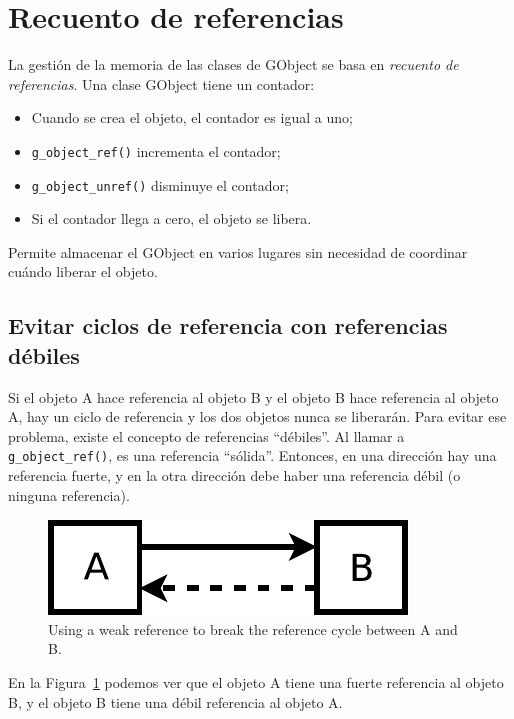 \section{Recuento de referencias}

La gestión de la memoria de las clases de GObject se basa en \emph{recuento de referencias}. Una clase GObject tiene un contador:
\begin{itemize}
    \item Cuando se crea el objeto, el contador es igual a uno;
    \item \lstinline{g_object_ref()} incrementa el contador;
    \item \lstinline{g_object_unref()} disminuye el contador;
    \item Si el contador llega a cero, el objeto se libera.
\end{itemize}

Permite almacenar el GObject en varios lugares sin necesidad de coordinar cuándo liberar el objeto.

\subsection{Evitar ciclos de referencia con referencias débiles}

Si el objeto A hace referencia al objeto B y el objeto B hace referencia al objeto A, hay un ciclo de referencia y los dos objetos nunca se liberarán. Para evitar ese problema, existe el concepto de referencias ``débiles''. Al llamar a \lstinline{g_object_ref()}, es una referencia ``sólida''. Entonces, en una dirección hay una referencia fuerte, y en la otra dirección debe haber una referencia débil (o ninguna referencia).

\begin{figure}
  \begin{center}
    \includegraphics[scale=0.75]{assets/img/weak-ref.pdf}
    \caption{Using a weak reference to break the reference cycle between A and B.}
    \label{oop-gobject-weak-ref-schema}
  \end{center}
\end{figure}

En la Figura~\ref{oop-gobject-weak-ref-schema} podemos ver que el objeto A tiene una fuerte referencia al objeto B, y el objeto B tiene una débil referencia al objeto A.

